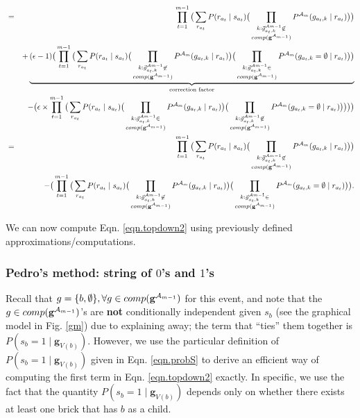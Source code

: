 \documentclass[11pt]{article}
\newcommand{\A}{{\cal A}}
\newcommand{\Am}{\A_{m}}
\newcommand{\gcompPrev}{comp(\mathbf{g}^{\A_{m-1}})}
\begin{document}
\begin{eqnarray}
&=&  \prod_{t=1}^{m-1} \big( \sum_{r_{a_t}} P(r_{a_t} \mid s_{a_t}) \big( \prod_{\substack{k : \vec{g}^{\A{m-1}}_{a_t,k} \not \in \\ \gcompPrev }} P^{\Am}(g_{{a_t},k} \mid r_{a_t}) \big)\big) \\
%
& & + \underbrace{(\epsilon-1) \big( \prod_{t=1}^{m-1} \big( \sum_{r_{a_t}} P(r_{a_t} \mid s_{a_t}) \big( \prod_{\substack{k : \vec{g}^{\A{m-1}}_{a_t,k} \not \in \\ \gcompPrev }} P^{\Am}(g_{{a_t},k} \mid r_{a_t}) \big) \big( \prod_{\substack{k : \vec{g}^{\A{m-1}}_{a_t,k} \in \\ \gcompPrev }} P^{\Am}(g_{{a_t},k} =\emptyset \mid r_{a_t}) \big)\big)}_{\text{correction factor}} \nonumber \\
%
& &- \big(\epsilon \times \prod_{t=1}^{m-1} \big( \sum_{r_{a_t}} P(r_{a_t} \mid s_{a_t}) \big( \prod_{\substack{k : \vec{g}^{\A{m-1}}_{a_t,k} \in \\ \gcompPrev }} P^{\Am}(g_{{a_t},k} \mid r_{a_t}) \big) \big( \prod_{\substack{k : \vec{g}^{\A{m-1}}_{a_t,k} \not \in \\ \gcompPrev }} P^{\Am}(g_{{a_t},k} = \emptyset \mid r_{a_t}) \big) \big) \big) \big) \nonumber \\
%
&=&  \prod_{t=1}^{m-1} \big( \sum_{r_{a_t}} P(r_{a_t} \mid s_{a_t}) \big( \prod_{\substack{k : \vec{g}^{\A{m-1}}_{a_t,k} \not \in \\ \gcompPrev }} P^{\Am}(g_{{a_t},k} \mid r_{a_t}) \big)\big) \\
%
& & -\big( \prod_{t=1}^{m-1} \big( \sum_{r_{a_t}} P(r_{a_t} \mid s_{a_t}) \big( \prod_{\substack{k : \vec{g}^{\A{m-1}}_{a_t,k} \not \in \\ \gcompPrev }} P^{\Am}(g_{{a_t},k} \mid r_{a_t}) \big) \big( \prod_{\substack{k : \vec{g}^{\A{m-1}}_{a_t,k} \in \\ \gcompPrev }} P^{\Am}(g_{{a_t},k} =\emptyset \mid r_{a_t}) \big)\big). \nonumber
\end{eqnarray}

We can now compute Eqn. \ref{eqn.topdown2} using previously defined approximations/computations.

\subsubsection*{Pedro's method: string of $0$'s and $1$'s}

Recall that $g = \{b, \emptyset\}, \forall g \in \gcompPrev$ for this event, and note that the $g \in \gcompPrev$'s are \textbf{not} conditionally independent given $s_b$ (see the graphical model in Fig. \ref{gm}) due to explaining away; the term that ``ties'' them together is  $P(s_b = 1 \mid \mathbf{g}_{V(b)})$. However, we use the particular definition of  $P(s_b = 1 \mid \mathbf{g}_{V(b)})$  given in Eqn. \ref{eqn.probS} to derive an efficient way of computing the first term in Eqn. \ref{eqn.topdown2} exactly. In specific, we use the fact that  the quantity $P(s_b = 1 \mid \mathbf{g}_{V(b)})$  depends only on whether there exists at least one brick that has $b$ as a child.
\end{document}
